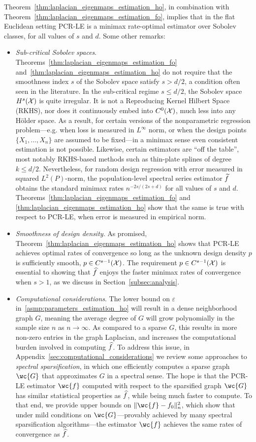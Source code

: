 Theorem~\ref{thm:laplacian_eigenmaps_estimation_ho}, in combination with Theorem~\ref{thm:laplacian_eigenmaps_estimation_fo}, implies that in the flat Euclidean setting PCR-LE is a minimax rate-optimal estimator over Sobolev classes, for all values of $s$ and $d$. Some other remarks:
\begin{itemize}
	\item \emph{Sub-critical Sobolev spaces}. Theorems~\ref{thm:laplacian_eigenmaps_estimation_fo} and~\ref{thm:laplacian_eigenmaps_estimation_ho} do not require that the smoothness index $s$ of the Sobolev space satisfy $s > d/2$, a condition often seen in the literature. In the sub-critical regime $s \leq d/2$, the Sobolev space $H^s(\mathcal{X})$ is quite irregular. It is not a Reproducing Kernel Hilbert Space (RKHS), nor does it continuously embed into $C^0(\mathcal{X})$, much less into any H\"{o}lder space. As a result, for certain versions of the nonparametric regression problem---e.g. when loss is measured in $L^{\infty}$ norm, or when the design points $\{X_1,\ldots,X_n\}$ are assumed to be fixed---in a minimax sense even consistent estimation is not possible. Likewise, certain estimators are ``off the table'', most notably RKHS-based methods such as thin-plate splines of degree $k \leq d/2$. Nevertheless, for random design regression with error measured in squared $L^2(P)$-norm, the population-level spectral series estimator $\widetilde{f}$ obtains the standard minimax rates $n^{-2s/(2s + d)}$ for all values of $s$ and $d$. Theorems~\ref{thm:laplacian_eigenmaps_estimation_fo} and \ref{thm:laplacian_eigenmaps_estimation_ho} show that the same is true with respect to PCR-LE, when error is measured in empirical norm.
	\item \emph{Smoothness of design density}. As promised,  Theorem~\ref{thm:laplacian_eigenmaps_estimation_ho} shows that PCR-LE achieves optimal rates of convergence so long as the unknown design density $p$ is sufficiently smooth, $p \in C^{s - 1}(\mathcal{X})$. The requirement $p \in C^{s - 1}(\mathcal{X})$ is essential to showing that $\widehat{f}$ enjoys the faster minimax rates of convergence when $s > 1$,  as we discuss in Section~\ref{subsec:analysis}. 
	\item \emph{Computational considerations}. The lower bound on $\varepsilon$ in~\ref{asmp:parameters_estimation_ho} will result in a dense neighborhood graph $G$, meaning the average degree of $G$ will grow polynomially in the sample size $n$ as $n \to \infty$. As compared to a sparse $G$, this results in more non-zero entries in the graph Laplacian, and increases the computational burden involved in computing $\widehat{f}$. To address this issue, in Appendix~\ref{sec:computational_considerations} we review some approaches to \emph{spectral sparsification}, in which one efficiently computes a sparse graph $\wc{G}$ that approximates $G$ in a spectral sense. The hope is that the PCR-LE estimator $\wc{f}$ computed with respect to the sparsified graph $\wc{G}$ has similar statistical properties as $\widehat{f}$, while being much faster to compute. To that end, we provide upper bounds on $\|\wc{f} - f_0\|_n^2$, which show that under mild conditions on $\wc{G}$---provably achieved by many spectral sparsification algorithms---the estimator $\wc{f}$ achieves the same rates of convergence as $\widehat{f}$. 

\end{itemize}
